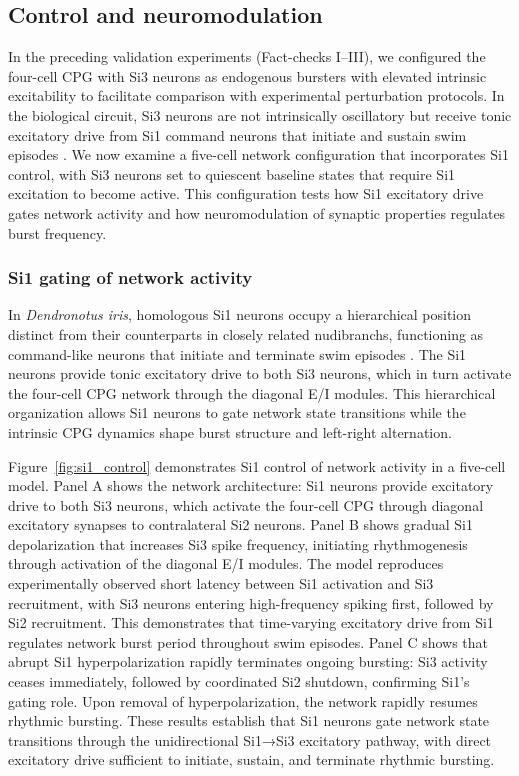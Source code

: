 \documentclass[nofootinbib,aip,amsmath,amssymb,preprint,twocolumn,floatfix,10pt]{revtex4-2}
\begin{document}
\subsection{Control and neuromodulation}

In the preceding validation experiments (Fact-checks I--III), we configured the four-cell CPG with Si3 neurons as endogenous bursters with elevated intrinsic excitability to facilitate comparison with experimental perturbation protocols. In the biological circuit, Si3 neurons are not intrinsically oscillatory but receive tonic excitatory drive from Si1 command neurons that initiate and sustain swim episodes \cite{sakurai2019command}. We now examine a five-cell network configuration that incorporates Si1 control, with Si3 neurons set to quiescent baseline states that require Si1 excitation to become active. This configuration tests how Si1 excitatory drive gates network activity and how neuromodulation of synaptic properties regulates burst frequency.

\subsubsection{Si1 gating of network activity}

In \textit{Dendronotus iris}, homologous Si1 neurons occupy a hierarchical position distinct from their counterparts in closely related nudibranchs, functioning as command-like neurons that initiate and terminate swim episodes \cite{sakurai2019command}. The Si1 neurons provide tonic excitatory drive to both Si3 neurons, which in turn activate the four-cell CPG network through the diagonal E/I modules. This hierarchical organization allows Si1 neurons to gate network state transitions while the intrinsic CPG dynamics shape burst structure and left-right alternation.


Figure~\ref{fig:si1_control} demonstrates Si1 control of network activity in a five-cell model. Panel A shows the network architecture: Si1 neurons provide excitatory drive to both Si3 neurons, which activate the four-cell CPG through diagonal excitatory synapses to contralateral Si2 neurons. Panel B shows gradual Si1 depolarization that increases Si3 spike frequency, initiating rhythmogenesis through activation of the diagonal E/I modules. The model reproduces experimentally observed short latency between Si1 activation and Si3 recruitment, with Si3 neurons entering high-frequency spiking first, followed by Si2 recruitment. This demonstrates that time-varying excitatory drive from Si1 regulates network burst period throughout swim episodes. Panel C shows that abrupt Si1 hyperpolarization rapidly terminates ongoing bursting: Si3 activity ceases immediately, followed by coordinated Si2 shutdown, confirming Si1's gating role. Upon removal of hyperpolarization, the network rapidly resumes rhythmic bursting. These results establish that Si1 neurons gate network state transitions through the unidirectional Si1→Si3 excitatory pathway, with direct excitatory drive sufficient to initiate, sustain, and terminate rhythmic bursting.
\end{document}

